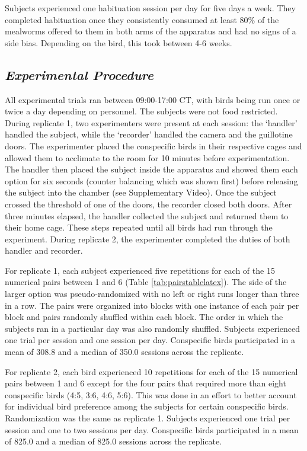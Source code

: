 \documentclass[
  ,pub,floatsintext]{apa6}
\begin{document}
Subjects experienced one habituation session per day for five days a week. They completed habituation once they consistently consumed at least 80\% of the mealworms offered to them in both arms of the apparatus and had no signs of a side bias. Depending on the bird, this took between 4-6 weeks.

\hypertarget{experimental-procedure-1}{%
\subsection{\texorpdfstring{\emph{Experimental Procedure}}{Experimental Procedure}}\label{experimental-procedure-1}}

All experimental trials ran between 09:00-17:00 CT, with birds being run once or twice a day depending on personnel. The subjects were not food restricted. During replicate 1, two experimenters were present at each session: the `handler' handled the subject, while the `recorder' handled the camera and the guillotine doors. The experimenter placed the conspecific birds in their respective cages and allowed them to acclimate to the room for 10 minutes before experimentation. The handler then placed the subject inside the apparatus and showed them each option for six seconds (counter balancing which was shown first) before releasing the subject into the chamber (see Supplementary Video). Once the subject crossed the threshold of one of the doors, the recorder closed both doors. After three minutes elapsed, the handler collected the subject and returned them to their home cage. These steps repeated until all birds had run through the experiment. During replicate 2, the experimenter completed the duties of both handler and recorder.

For replicate 1, each subject experienced five repetitions for each of the 15 numerical pairs between 1 and 6 (Table \ref{tab:pairstablelatex}). The side of the larger option was pseudo-randomized with no left or right runs longer than three in a row. The pairs were organized into blocks with one instance of each pair per block and pairs randomly shuffled within each block. The order in which the subjects ran in a particular day was also randomly shuffled. Subjects experienced one trial per session and one session per day. Conspecific birds participated in a mean of 308.8 and a median of 350.0 sessions across the replicate.

For replicate 2, each bird experienced 10 repetitions for each of the 15 numerical pairs between 1 and 6 except for the four pairs that required more than eight conspecific birds (4:5, 3:6, 4:6, 5:6). This was done in an effort to better account for individual bird preference among the subjects for certain conspecific birds. Randomization was the same as replicate 1. Subjects experienced one trial per session and one to two sessions per day. Conspecific birds participated in a mean of 825.0 and a median of 825.0 sessions across the replicate.
\end{document}
